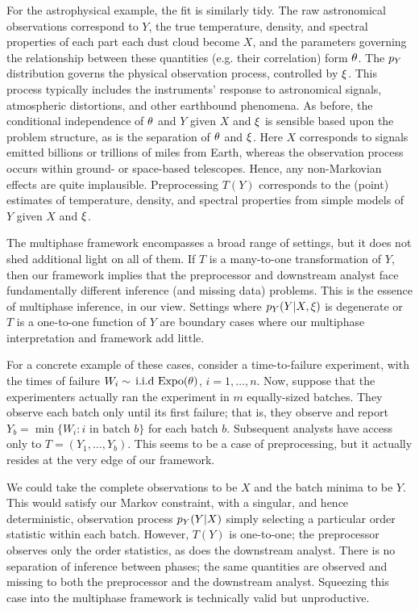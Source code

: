 For the astrophysical example, the fit is similarly tidy.
The raw astronomical observations correspond to $Y$, the true temperature, density, and spectral properties of each part each dust cloud become $X$, and the parameters governing the relationship between these quantities (e.g.
their correlation) form $\theta$.
The $p_Y$ distribution governs the physical observation process, controlled by $\xi$.
This process typically includes the instruments' response to astronomical signals, atmospheric distortions, and other earthbound phenomena.
As before, the conditional independence of $\theta$ and $Y$ given $X$ and $\xi$ is sensible based upon the problem structure, as is the separation of $\theta$ and $\xi$. Here  $X$ corresponds to signals emitted billions or trillions of miles from Earth, whereas the observation process occurs within ground- or space-based telescopes.
Hence, any non-Markovian effects are quite implausible.
Preprocessing $T(Y)$ corresponds to the (point) estimates of temperature, density, and spectral properties from simple models of $Y$ given $X$ and $\xi$.

The multiphase framework encompasses a broad range of settings, but it does not shed additional light on all of them.
If $T$ is a many-to-one transformation of $Y$, then our framework implies that the preprocessor and downstream analyst face fundamentally different inference (and missing data) problems.
This is the essence of multiphase inference, in our view.
Settings where $p_Y(Y|X, \xi)$ is degenerate or $T$ is a one-to-one function of $Y$ are boundary cases where our multiphase interpretation and framework add little.

For a concrete example of these cases, consider a time-to-failure experiment, with the times of failure $W_i \sim \,\mbox{i.i.d}\, \operatorname{Expo}(\theta)$, $i = 1, \ldots, n$.
Now, suppose that the experimenters actually ran the experiment in $m$ equally-sized batches.
They observe each batch only until its first failure; that is, they observe and report $Y_b = \min \{W_i : i \mbox{ in batch } b \}$ for each batch $b$.
Subsequent analysts have access only to $T = (Y_1, \ldots, Y_b)$.
This seems to be a case of preprocessing, but it actually resides at the very edge of our framework.

We could take the complete observations to be $X$ and the batch minima to be $Y$.
This would satisfy our Markov constraint, with a singular, and hence deterministic, observation process $p_Y(Y | X)$ simply selecting a particular order statistic within each batch.
However, $T(Y)$ is one-to-one; the preprocessor observes only the order statistics, as does the downstream analyst.
There is no separation of inference between phases; the same quantities are observed and missing to both the preprocessor and the downstream analyst.
Squeezing this case into the multiphase framework is technically valid but unproductive.

